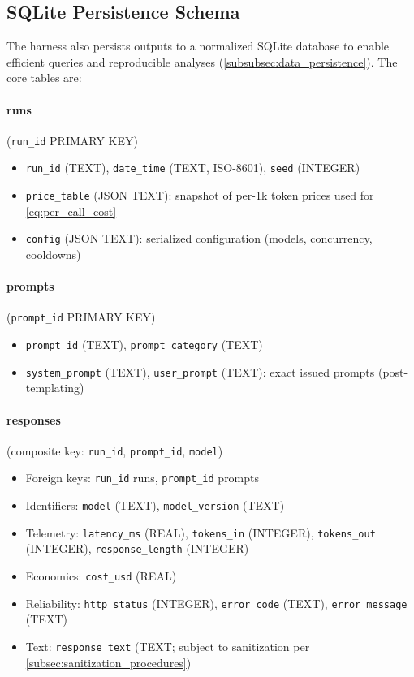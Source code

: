 \subsection{SQLite Persistence Schema}\label{app:sqlite_schema}

The harness also persists outputs to a normalized SQLite database to enable efficient queries and reproducible analyses (\cref{subsubsec:data_persistence}). The core tables are:

\paragraph{runs} (\texttt{run\_id} PRIMARY KEY)
\begin{itemize}
\item \texttt{run\_id} (TEXT), \texttt{date\_time} (TEXT, ISO-8601), \texttt{seed} (INTEGER)
\item \texttt{price\_table} (JSON TEXT): snapshot of per-1k token prices used for \cref{eq:per_call_cost}
\item \texttt{config} (JSON TEXT): serialized configuration (models, concurrency, cooldowns)
\end{itemize}

\paragraph{prompts} (\texttt{prompt\_id} PRIMARY KEY)
\begin{itemize}
\item \texttt{prompt\_id} (TEXT), \texttt{prompt\_category} (TEXT)
\item \texttt{system\_prompt} (TEXT), \texttt{user\_prompt} (TEXT): exact issued prompts (post-templating)
\end{itemize}

\paragraph{responses} (composite key: \texttt{run\_id}, \texttt{prompt\_id}, \texttt{model})
\begin{itemize}
\item Foreign keys: \texttt{run\_id} \textrightarrow{} runs, \texttt{prompt\_id} \textrightarrow{} prompts
\item Identifiers: \texttt{model} (TEXT), \texttt{model\_version} (TEXT)
\item Telemetry: \texttt{latency\_ms} (REAL), \texttt{tokens\_in} (INTEGER), \texttt{tokens\_out} (INTEGER), \texttt{response\_length} (INTEGER)
\item Economics: \texttt{cost\_usd} (REAL)
\item Reliability: \texttt{http\_status} (INTEGER), \texttt{error\_code} (TEXT), \texttt{error\_message} (TEXT)
\item Text: \texttt{response\_text} (TEXT; subject to sanitization per \cref{subsec:sanitization_procedures})
\end{itemize}

